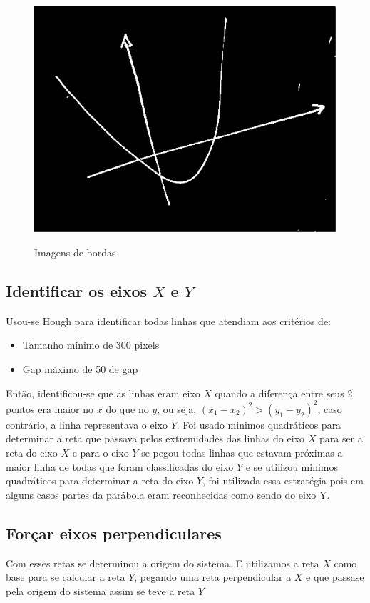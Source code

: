 \documentclass{article}
\begin{document}
\begin{figure}[h!]
        {\includegraphics[scale=0.17]{exemplo3_edge.PNG}}
    \caption{Imagens de bordas}
    \end{figure}

   \subsection{Identificar os eixos \(X\) e \(Y\)}
   Usou-se Hough para identificar todas linhas que atendiam aos critérios de:
   \begin{itemize}
       \item    Tamanho mínimo de 300 pixels
       \item    Gap máximo de 50 de gap 
   \end{itemize}
   Então, identificou-se que as linhas eram eixo \(X\) quando a diferença entre seus 2 pontos era maior no \(x\) do que no \(y\), ou seja, \((x_1 - x_2)^2 > (y_1 - y_2) ^2\), caso contrário, a linha representava o eixo \(Y\).
  Foi usado minimos quadráticos para determinar a reta que passava pelos extremidades das linhas do eixo \(X\) para ser a reta do eixo \(X\) e para o eixo \(Y\) se pegou todas linhas que estavam próximas a maior linha de todas que foram classificadas do eixo \(Y\) e se utilizou minimos quadráticos para determinar a reta do eixo \(Y\), foi utilizada essa estratégia pois em alguns casos partes da parábola eram reconhecidas como sendo do eixo Y.
 
 \subsection{Forçar eixos perpendiculares}
   Com esses retas se determinou a origem do sistema. E utilizamos a reta \(X\) como base para se calcular a reta \(Y\), pegando uma reta perpendicular a \(X\) e que passase pela origem do sistema assim se teve a reta \(Y\)
   
\end{document}
